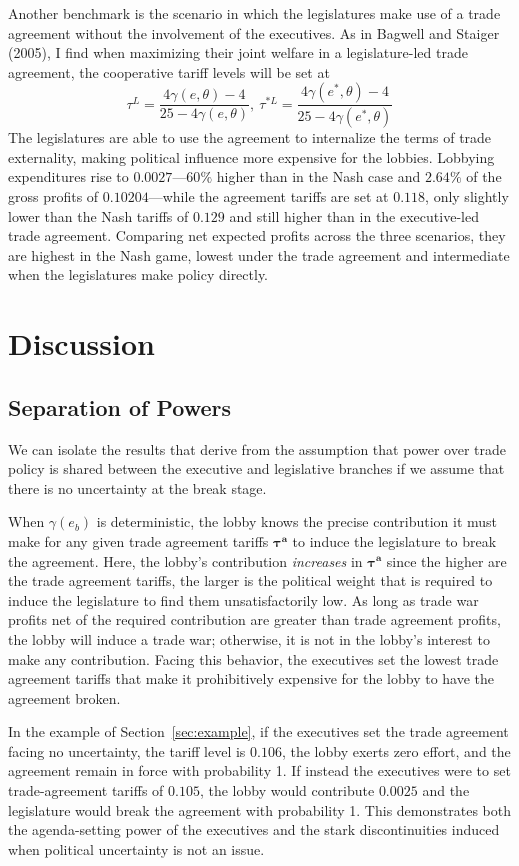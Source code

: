 \documentclass[10pt]{article}
\newcommand{\ve}{\theta}
\newcommand{\bta}{\bm{\tau^a}}
\newcommand{\ga}{\gamma}
\begin{document}
Another benchmark is the scenario in which the legislatures make use of a trade agreement without the involvement of the executives. As in Bagwell and Staiger (2005), I find when maximizing their joint welfare in a legislature-led trade agreement, the cooperative tariff levels will be set at
\[
  \tau^L = \frac{4\ga(e,\ve)-4}{25-4\ga(e,\ve)}, \ \tau^{*L} = \frac{4\ga(e^*,\ve)-4}{25-4\ga(e^*,\ve)}
\]
The legislatures are able to use the agreement to internalize the terms of trade externality, making political influence more expensive for the lobbies. Lobbying expenditures rise to $0.0027$---60$\%$ higher than in the Nash case and $2.64\%$ of the gross profits of $0.10204$---while the agreement tariffs are set at $0.118$, only slightly lower than the Nash tariffs of $0.129$ and still higher than in the executive-led trade agreement. Comparing net expected profits across the three scenarios, they are highest in the Nash game, lowest under the trade agreement and intermediate when the legislatures make policy directly.


\section{Discussion}
\label{sec:dis}

\subsection{Separation of Powers}
\label{sec:sep_powers}
We can isolate the results that derive from the assumption that power over trade policy is shared between the executive and legislative branches if we assume that there is no uncertainty at the break stage. 

When $\ga(e_b)$ is deterministic, the lobby knows the precise contribution it must make for any given trade agreement tariffs $\bta$ to induce the legislature to break the agreement. Here, the lobby's contribution \textit{increases} in $\bta$ since the higher are the trade agreement tariffs, the larger is the political weight that is required to induce the legislature to find them unsatisfactorily low. As long as trade war profits net of the required contribution are greater than trade agreement profits, the lobby will induce a trade war; otherwise, it is not in the lobby's interest to make any contribution. Facing this behavior, the executives set the lowest trade agreement tariffs that make it prohibitively expensive for the lobby to have the agreement broken.

In the example of Section~\ref{sec:example}, if the executives set the trade agreement facing no uncertainty, the tariff level is $0.106$, the lobby exerts zero effort, and the agreement remain in force with probability 1. If instead the executives were to set trade-agreement tariffs of $0.105$, the lobby would contribute $0.0025$ and the legislature would break the agreement with probability 1. This demonstrates both the agenda-setting power of the executives and the stark discontinuities induced when political uncertainty is not an issue.
\end{document}
